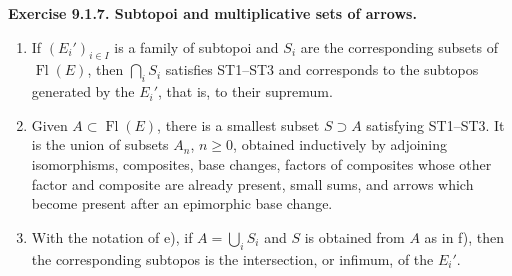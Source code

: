 \documentclass[11pt]{article}
\newcommand{\Fl}{\operatorname{Fl}}
\newenvironment{remarktext}[1]{\par\medskip\noindent\textbf{#1.}\ }{\par\medskip}
\begin{document}
\begin{remarktext}{Exercise 9.1.7. Subtopoi and multiplicative sets of arrows}
\begin{enumerate}[label=\alph*)]
\item If \((E_i')_{i\in I}\) is a family of subtopoi and \(S_i\) are the corresponding subsets of \(\Fl(E)\), then \(\bigcap_i S_i\) satisfies ST1--ST3 and corresponds to the subtopos generated by the \(E_i'\), that is, to their supremum.

\item Given \(A\subset\Fl(E)\), there is a smallest subset \(S\supset A\) satisfying ST1--ST3. It is the union of subsets \(A_n\), \(n\ge 0\), obtained inductively by adjoining isomorphisms, composites, base changes, factors of composites whose other factor and composite are already present, small sums, and arrows which become present after an epimorphic base change.
\item With the notation of e), if \(A=\bigcup_iS_i\) and \(S\) is obtained from \(A\) as in f), then the corresponding subtopos is the intersection, or infimum, of the \(E_i'\).
\end{enumerate}
\end{remarktext}
\end{document}
